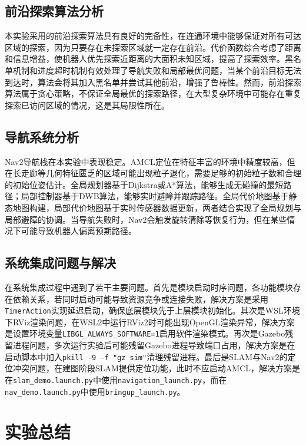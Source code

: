 \documentclass[a4paper,12pt]{article}
\begin{document}
\subsection{前沿探索算法分析}

本实验采用的前沿探索算法具有良好的完备性，在连通环境中能够保证对所有可达区域的探索，因为只要存在未探索区域就一定存在前沿。代价函数综合考虑了距离和信息增益，使机器人优先探索近距离的大面积未知区域，提高了探索效率。黑名单机制和进度超时机制有效处理了导航失败和局部最优问题，当某个前沿目标无法到达时，算法会将其加入黑名单并尝试其他前沿，增强了鲁棒性。然而，前沿探索算法属于贪心策略，不保证全局最优的探索路径，在大型复杂环境中可能存在重复探索已访问区域的情况，这是其局限性所在。

\subsection{导航系统分析}

Nav2导航栈在本实验中表现稳定。AMCL定位在特征丰富的环境中精度较高，但在长走廊等几何特征匮乏的区域可能出现粒子退化，需要足够的初始粒子数和合理的初始位姿估计。全局规划器基于Dijkstra或A*算法，能够生成无碰撞的最短路径；局部控制器基于DWB算法，能够实时避障并跟踪路径。全局代价地图基于静态地图构建，局部代价地图基于实时传感器数据更新，两者结合实现了全局规划与局部避障的协调。当导航失败时，Nav2会触发旋转清除等恢复行为，但在某些情况下可能导致机器人偏离预期路径。

\subsection{系统集成问题与解决}

在系统集成过程中遇到了若干主要问题。首先是模块启动时序问题，各功能模块存在依赖关系，若同时启动可能导致资源竞争或连接失败，解决方案是采用\texttt{TimerAction}实现延迟启动，确保底层模块先于上层模块初始化。其次是WSL环境下RViz渲染问题，在WSL2中运行RViz2时可能出现OpenGL渲染异常，解决方案是设置环境变量\texttt{LIBGL\_ALWAYS\_SOFTWARE=1}启用软件渲染模式。再次是Gazebo残留进程问题，多次运行实验后可能残留Gazebo进程导致端口占用，解决方案是在启动脚本中加入\texttt{pkill -9 -f "gz sim"}清理残留进程。最后是SLAM与Nav2的定位冲突问题，在建图阶段SLAM提供定位功能，此时不应启动AMCL，解决方案是在\texttt{slam\_demo.launch.py}中使用\texttt{navigation\_launch.py}，而在\texttt{nav\_demo.launch.py}中使用\texttt{bringup\_launch.py}。

\section{实验总结}
\end{document}

